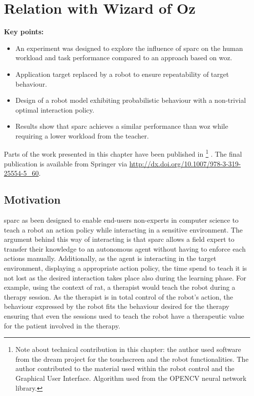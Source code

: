 \chapter{Relation with Wizard of Oz}\label{chap:woz}

\graphicspath{{images/woz/}}

\begin{framed}
	\textbf{Key points:}
	
	\begin{itemize}
		\item An experiment was designed to explore the influence of \gls{sparc} on the human workload and task performance compared to an approach based on \gls{woz}.
		\item Application target replaced by a robot to ensure repeatability of target behaviour.
		\item Design of a robot model exhibiting probabilistic behaviour with a non-trivial optimal interaction policy.
		\item Results show that \gls{sparc} achieves a similar performance than \gls{woz} while requiring a lower workload from the teacher.
	\end{itemize}
\end{framed}

Parts of the work presented in this chapter have been published in \cite{senft2015sparc} \footnote{Note about technical contribution in this chapter: the author used software from the \gls{dream} project for the touchscreen and the robot functionalities. The author contributed to the material used within the robot control and the Graphical User Interface. Algorithm used from the OPENCV neural network library.} . The final publication is available from Springer via \url{http://dx.doi.org/10.1007/978-3-319-25554-5_60}.

\newpage

\section{Motivation}

\gls{sparc} as been designed to enable end-users non-experts in computer science to teach a robot an action policy while interacting in a sensitive environment. The argument behind this way of interacting is that \gls{sparc} allows a field expert to transfer their knowledge to an autonomous agent without having to enforce each actions manually. Additionally, as the agent is interacting in the target environment, displaying a appropriate action policy, the time spend to teach it is not lost as the desired interaction takes place also during the learning phase. For example, using the context of \gls{rat}, a therapist would teach the robot during a therapy session. As the therapist is in total control of the robot's action, the behaviour expressed by the robot fits the  behaviour desired for the therapy ensuring that even the sessions used to teach the robot have a therapeutic value for the patient involved in the therapy.

